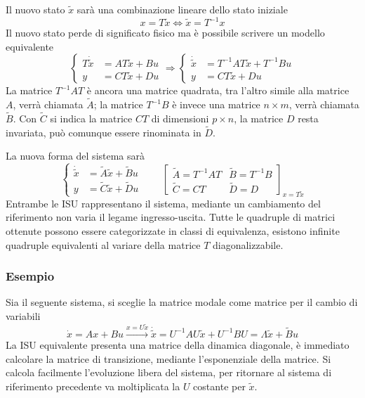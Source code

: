 Il nuovo stato $\tilde{x}$ sarà una combinazione lineare dello stato iniziale
$$
x=T\tilde{x} \Leftrightarrow \tilde{x} = T^{-1}x
$$
Il nuovo stato perde di significato fisico ma è possibile scrivere un modello
equivalente
$$\left\{\begin{aligned}
T\dot{\tilde{x}} &= AT\tilde{x} + Bu \\
y &= CT\tilde{x} + Du
\end{aligned}\right. \Rightarrow
\left\{\begin{aligned}
\dot\tilde{x} &= T^{-1}AT \tilde{x} + T^{-1}Bu \\
y &= CT\tilde{x} + Du
\end{aligned}\right.
$$
La matrice $T^{-1}AT$ è ancora una matrice quadrata, tra l'altro simile alla
matrice $A$, verrà chiamata $\tilde{A}$; la matrice $T^{-1}B$ è invece una
matrice $n\times m$, verrà chiamata $\tilde{B}$.
Con $\tilde{C}$ si indica la matrice $CT$ di dimensioni $p\times n$, la matrice
$D$ resta invariata, può comunque essere rinominata in $\tilde{D}$.

La nuova forma del sistema sarà
$$\left\{\begin{aligned}
\dot{\tilde{x}} &= \tilde{A}\tilde{x} + \tilde{B}u\\
y &= \tilde{C}\tilde{x} + \tilde{D}u
\end{aligned}\right.\qquad
\left[\begin{array}{ll}
\tilde{A}=T^{-1}AT & \tilde{B} = T^{-1}B\\
\tilde{C} = CT & \tilde{D} = D
\end{array}\right]_{x=T\tilde{x}}
$$
Entrambe le ISU rappresentano il sistema, mediante un cambiamento del
riferimento non varia il legame ingresso-uscita.
Tutte le quadruple di matrici ottenute possono essere categorizzate in classi
di equivalenza, esistono infinite quadruple equivalenti al variare della
matrice $T$ diagonalizzabile.

\subsubsection{Esempio}
Sia il seguente sistema, si sceglie la matrice modale come matrice per il
cambio di variabili
$$
\dot{x} = Ax +Bu \stackrel{x=U\tilde{x}}{\longrightarrow} \dot{\tilde{x}} =
U^{-1}AU\tilde{x} + U^{-1}BU = \Lambda\tilde{x} + \tilde{B}u
$$
La ISU equivalente presenta una matrice della dinamica diagonale, è immediato
calcolare la matrice di transizione, mediante l'esponenziale della matrice.
Si calcola facilmente l'evoluzione libera del sistema, per ritornare al sistema
di riferimento precedente va moltiplicata la $U$ costante per $\tilde{x}$.
